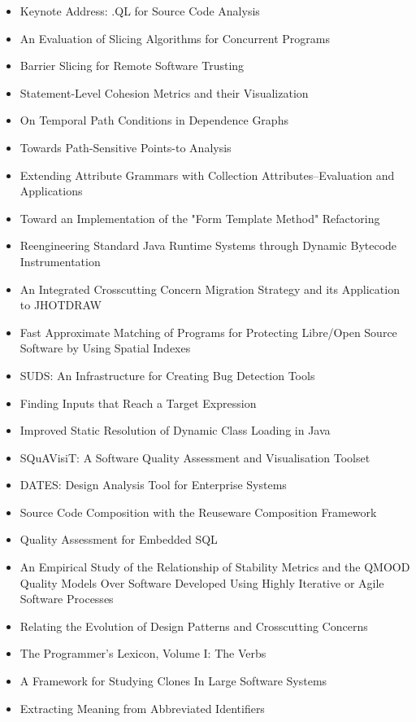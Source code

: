 {\small
\begin{itemize}[itemsep=-1ex]
  \item Keynote Address: .QL for Source Code Analysis
  \item An Evaluation of Slicing Algorithms for Concurrent Programs
  \item Barrier Slicing for Remote Software Trusting
  \item Statement-Level Cohesion Metrics and their Visualization
  \item On Temporal Path Conditions in Dependence Graphs {\color{blue} \checkmark}{\color{red} \texttimes}
  \item Towards Path-Sensitive Points-to Analysis {\color{blue} \checkmark}{\color{red} \texttimes}
  \item Extending Attribute Grammars with Collection Attributes--Evaluation and Applications {\color{blue} \checkmark}{\color{blue} \checkmark}
  \item Toward an Implementation of the "Form Template Method" Refactoring
  \item Reengineering Standard Java Runtime Systems through Dynamic Bytecode Instrumentation
  \item An Integrated Crosscutting Concern Migration Strategy and its Application to JHOTDRAW
  \item Fast Approximate Matching of Programs for Protecting Libre/Open Source Software by Using Spatial Indexes {\color{blue} \checkmark}{\color{red} \texttimes}
  \item SUDS: An Infrastructure for Creating Bug Detection Tools {\color{blue} \checkmark}{\color{red} \texttimes}
  \item Finding Inputs that Reach a Target Expression
  \item Improved Static Resolution of Dynamic Class Loading in Java
  \item SQuAVisiT: A Software Quality Assessment and Visualisation Toolset
  \item DATES: Design Analysis Tool for Enterprise Systems
  \item Source Code Composition with the Reuseware Composition Framework
  \item Quality Assessment for Embedded SQL
  \item An Empirical Study of the Relationship of Stability Metrics and the QMOOD Quality Models Over Software Developed Using Highly Iterative or Agile Software Processes
  \item Relating the Evolution of Design Patterns and Crosscutting Concerns {\color{blue} \checkmark}{\color{red} \texttimes}
  \item The Programmer's Lexicon, Volume I: The Verbs {\color{blue} \checkmark}{\color{red} \texttimes}
  \item A Framework for Studying Clones In Large Software Systems
  \item Extracting Meaning from Abbreviated Identifiers
\end{itemize}
}

